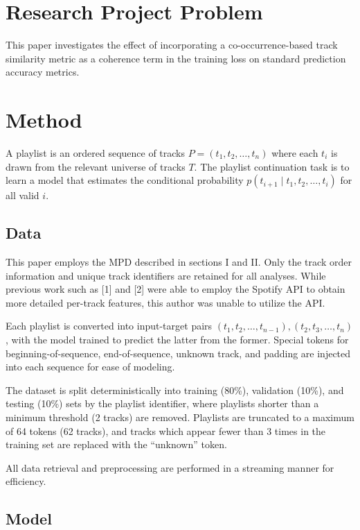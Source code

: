 \documentclass[conference]{IEEEtran}
\begin{document}
\section{Research Project Problem}

This paper investigates the effect of incorporating a co-occurrence-based track similarity metric as a coherence term in 
the training loss on standard prediction accuracy metrics.

\section{Method}

A playlist is an ordered sequence of tracks $P = (t_1, t_2, \ldots, t_n)$ where each $t_i$ is drawn from the relevant universe 
of tracks $T$. The playlist continuation task is to learn a model that estimates the conditional probability 
$p(t_{i+1} \mid t_1, t_2, \ldots, t_i)$ for all valid $i$.

\subsection{Data}

This paper employs the MPD described in sections I and II. Only the track order information and unique track identifiers 
are retained for all analyses. While previous work such as [1] and [2] were able to employ the Spotify API to obtain more 
detailed per-track features, this author was unable to utilize the API.

Each playlist is converted into input-target pairs $(t_1, t_2, \ldots, t_{n-1}), (t_2, t_3, \ldots, t_n)$, with the model 
trained to predict the latter from the former. Special tokens for beginning-of-sequence, end-of-sequence, unknown track, 
and padding are injected into each sequence for ease of modeling. 

The dataset is split deterministically into training (80\%), validation (10\%), and testing (10\%) sets by the playlist identifier, where 
playlists shorter than a minimum threshold (2 tracks) are removed. Playlists are truncated to a maximum of 64 tokens (62 tracks),
and tracks which appear fewer than 3 times in the training set are replaced with the ``unknown'' token.

All data retrieval and preprocessing are performed in a streaming manner for efficiency.

\subsection{Model}
\end{document}
